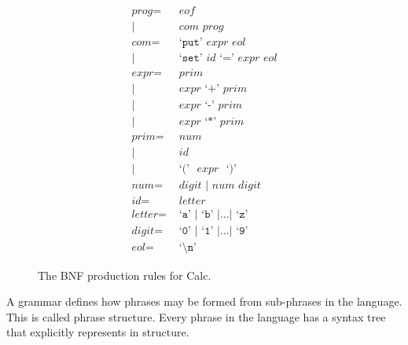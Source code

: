 \documentclass[a4paper, openany]{memoir}
\begin{document}
\begin{figure}[H]
    \begin{align*}
        \textit{prog} =& \textit{ eof} \\
        |\hspace{2pt} & \textit{ com prog} \\
        \textit{com} =& \text{ `}\texttt{put}\text{' } \textit{expr eol} \\
        |\hspace{2pt} & \text{ `}\texttt{set}\text{' } \textit{id} \text{ `}\texttt{=}\text{' } \textit{expr eol} \\
        \textit{expr} =& \textit{  prim} \\
        |\hspace{2pt} & \textit{ expr} \text{ `}\texttt{+}\text{' } \textit{prim} \\
        |\hspace{2pt} & \textit{ expr} \text{ `}\texttt{-}\text{' } \textit{prim} \\
        |\hspace{2pt} & \textit{ expr} \text{ `}\texttt{*}\text{' } \textit{prim} \\
        \textit{prim} =& \textit{ num} \\
        |\hspace{2pt} & \textit{ id} \\
        |\hspace{2pt} & \text{ `}\texttt{(}\text{' } \textit{ expr } \text{ `}\texttt{)}\text{'} \\
        \textit{num} =& \textit{ digit } | \textit{ num digit} \\
        \textit{id} =& \textit{ letter} \\
        \textit{letter} =& \text{ `}\texttt{a}\text{' } | \text{ `}\texttt{b}\text{' } | \dots | \text{ `}\texttt{z}\text{' } \\
        \textit{digit} =& \text{ `}\texttt{0}\text{' } | \text{ `}\texttt{1}\text{' } | \dots | \text{ `}\texttt{9}\text{'} \\
        \textit{eol} =& \text{ `}\texttt{\textbackslash n}\text{'}
    \end{align*}
    \caption{The BNF production rules for Calc.}
\end{figure}

A grammar defines how phrases may be formed from sub-phrases in the language. This is called phrase structure. Every phrase in the language has a syntax tree that explicitly represents in structure.
\end{document}
